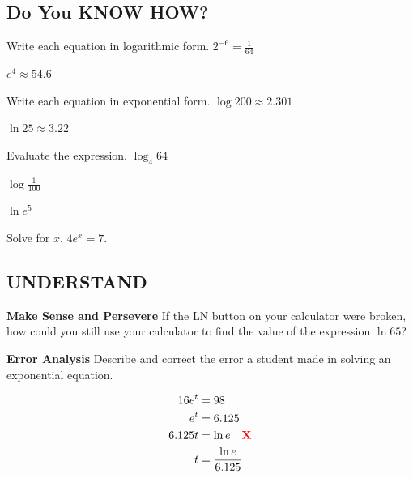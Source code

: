 \documentclass{article}
\newenvironment{practice}[2]{}{}
\begin{document}
\subsection*{Do You KNOW HOW?}

Write each equation in logarithmic form.
\begin{practice}{5}{?}
$2^{-6} = \frac{1}{64}$
\end{practice}

\begin{practice}{6}{?}
$e^4 \approx 54.6$
\end{practice}

Write each equation in exponential form.
\begin{practice}{7}{?}
$\log 200 \approx 2.301$
\end{practice}

\begin{practice}{8}{?}
$\ln 25 \approx 3.22$
\end{practice}

Evaluate the expression.
\begin{practice}{9}{?}
$\log_4 64$
\end{practice}

\begin{practice}{10}{?}
$\log \frac{1}{100}$
\end{practice}

\begin{practice}{11}{?}
$\ln e^5$
\end{practice}

\begin{practice}{12}{?}
Solve for $x$. $4e^x = 7$.
\end{practice}

\subsection*{UNDERSTAND}

\begin{practice}{13}{?}
\textbf{Make Sense and Persevere} If the LN button on your calculator were broken, how could you still use your calculator to find the value of the expression $\ln 65$?
\end{practice}

\begin{practice}{14}{?}
\textbf{Error Analysis} Describe and correct the error a student made in solving an exponential equation.

\begin{align*}
16e^t &= 98 \\
e^t &= 6.125 \\
6.125t &= \ln e \quad \text{\textcolor{red}{\textbf{X}}} \\
t &= \frac{\ln e}{6.125}
\end{align*}
\end{practice}
\end{document}
